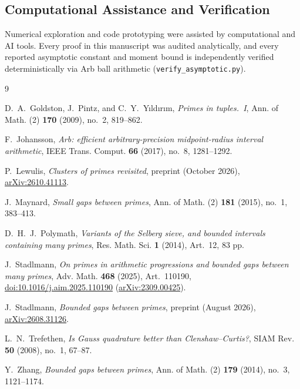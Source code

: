 \documentclass[11pt, reqno]{amsart}
\theoremstyle{remark}
\numberwithin{equation}{section}
\begin{document}
\subsection*{Computational Assistance and Verification}
Numerical exploration and code prototyping were assisted by computational and AI tools. Every proof
in this manuscript was audited analytically, and every reported asymptotic constant and moment bound
is independently verified deterministically via Arb ball arithmetic (\texttt{verify\_asymptotic.py}).

\begin{thebibliography}{9}\raggedright

D.~A.~Goldston, J.~Pintz, and C.~Y.~Y{\i}ld{\i}r{\i}m,
\emph{Primes in tuples.~I},
Ann. of Math. (2) \textbf{170} (2009), no.~2, 819--862.

F.~Johansson,
\emph{Arb: efficient arbitrary-precision midpoint-radius interval arithmetic},
IEEE Trans. Comput. \textbf{66} (2017), no.~8, 1281--1292.

P.~Lewulis,
\emph{Clusters of primes revisited},
preprint (October 2026), \href{https://arxiv.org/abs/2610.41113}{arXiv:2610.41113}.

J.~Maynard,
\emph{Small gaps between primes},
Ann. of Math. (2) \textbf{181} (2015), no.~1, 383--413.

D.~H.~J.~Polymath,
\emph{Variants of the Selberg sieve, and bounded intervals containing many primes},
Res. Math. Sci. \textbf{1} (2014), Art.~12, 83 pp.

J.~Stadlmann,
\emph{On primes in arithmetic progressions and bounded gaps between many primes},
Adv. Math. \textbf{468} (2025), Art.~110190, \href{https://doi.org/10.1016/j.aim.2025.110190}{doi:10.1016/j.aim.2025.110190}
(\href{https://arxiv.org/abs/2309.00425}{arXiv:2309.00425}).

J.~Stadlmann,
\emph{Bounded gaps between primes},
preprint (August 2026), \href{https://arxiv.org/abs/2608.31126}{arXiv:2608.31126}.

L.~N.~Trefethen,
\emph{Is Gauss quadrature better than Clenshaw--Curtis?},
SIAM Rev. \textbf{50} (2008), no.~1, 67--87.

Y.~Zhang,
\emph{Bounded gaps between primes},
Ann. of Math. (2) \textbf{179} (2014), no.~3, 1121--1174.

\end{thebibliography}
\end{document}
